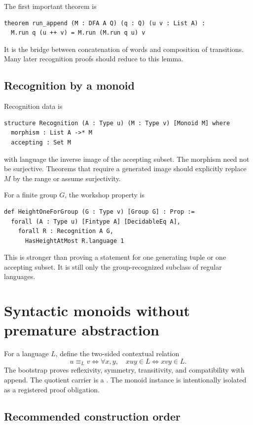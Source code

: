 \documentclass{amsart}
\begin{document}
The first important theorem is
\begin{lstlisting}[language={}]
theorem run_append (M : DFA A Q) (q : Q) (u v : List A) :
  M.run q (u ++ v) = M.run (M.run q u) v
\end{lstlisting}
It is the bridge between concatenation of words and composition of transitions.  Many later recognition proofs should reduce to this lemma.

\subsection{Recognition by a monoid}

Recognition data is
\begin{lstlisting}[language={}]
structure Recognition (A : Type u) (M : Type v) [Monoid M] where
  morphism : List A ->* M
  accepting : Set M
\end{lstlisting}
with language the inverse image of the accepting subset.  The morphism need not be surjective.  Theorems that require a generated image should explicitly replace $M$ by the range or assume surjectivity.

For a finite group $G$, the workshop property is
\begin{lstlisting}[language={}]
def HeightOneForGroup (G : Type v) [Group G] : Prop :=
  forall (A : Type u) [Fintype A] [DecidableEq A],
    forall R : Recognition A G,
      HasHeightAtMost R.language 1
\end{lstlisting}
This is stronger than proving a statement for one generating tuple or one accepting subset.  It is still only the group-recognized subclass of regular languages.

\section{Syntactic monoids without premature abstraction}

For a language $L$, define the two-sided contextual relation
\[
 u\equiv_L v
 \Longleftrightarrow
 \forall x,y,\quad xuy\in L\Longleftrightarrow xvy\in L.
\]
The bootstrap proves reflexivity, symmetry, transitivity, and compatibility with append.  The quotient carrier is a .  The monoid instance is intentionally isolated as a registered proof obligation.

\subsection{Recommended construction order}
\end{document}
